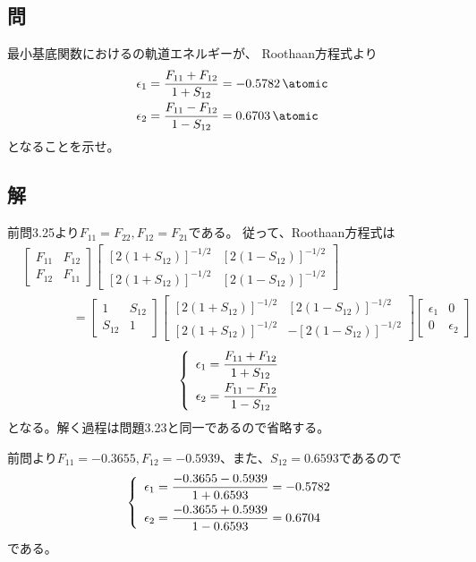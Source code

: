\subsection{問}
最小基底関数におけるの軌道エネルギーが、
Roothaan方程式より
\begin{align}
	\epsilon_1
&=
	\frac{F_{11}+F_{12}}{1+S_{12}}
=
	\SI{-0.5782}{\atomic} \\
%
%
	\epsilon_2
&=
	\frac{F_{11}-F_{12}}{1-S_{12}}
=
	\SI{+0.6703}{\atomic}
\end{align}
となることを示せ。


\subsection{解}
前問3.25より$F_{11}=F_{22}, F_{12}=F_{21}$である。
従って、Roothaan方程式は
\begin{align}
&
	\left[
	\begin{array}{cc}
		F_{11} & F_{12} \\
		F_{12} & F_{11}
	\end{array}
	\right]
	\left[
	\begin{array}{cc}
		\left[2(1+S_{12})\right]^{-1/2} & \left[2(1-S_{12})\right]^{-1/2} \\
		\left[2(1+S_{12})\right]^{-1/2} & \left[2(1-S_{12})\right]^{-1/2}
	\end{array}
	\right] \nonumber\\
&\qquad\qquad
=
	\left[
	\begin{array}{cc}
		1 & S_{12} \\
		S_{12} & 1
	\end{array}
	\right]
	\left[
	\begin{array}{cc}
		\left[2(1+S_{12})\right]^{-1/2} & \left[2(1-S_{12})\right]^{-1/2} \\
		\left[2(1+S_{12})\right]^{-1/2} & -\left[2(1-S_{12})\right]^{-1/2}
	\end{array}
	\right]
	\left[
	\begin{array}{cc}
		\epsilon_1 & 0 \\
		0 & \epsilon_2
	\end{array}
	\right]
\end{align}
\begin{align}
	\left\{
	\begin{array}{>{\displaystyle}l}
			\epsilon_1
		=
			\frac{F_{11}+F_{12}}{1+S_{12}} \\[3mm]
			\epsilon_2
		=
			\frac{F_{11}-F_{12}}{1-S_{12}}
	\end{array}
	\right.
\end{align}
となる。解く過程は問題3.23と同一であるので省略する。

前問より$F_{11}=-0.3655, F_{12}=-0.5939$、また、$S_{12}=0.6593$であるので
\begin{align}
	\left\{
	\begin{array}{>{\displaystyle}l}
			\epsilon_1
		=
			\frac{-0.3655-0.5939}{1+0.6593}
		=
			-0.5782 \\[3mm]
			\epsilon_2
		=
			\frac{-0.3655+0.5939}{1-0.6593}
		=
			0.6704
	\end{array}
	\right.
\end{align}
である。